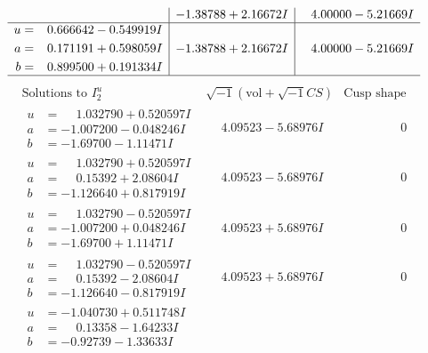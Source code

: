 \documentclass[1p]{elsarticle_modified}
\theoremstyle{definition}
\newcommand{\I}{\sqrt{-1}}
\begin{document}
$$\begin{array}{c|c|c}
 & -1.38788 + 2.16672 I & \phantom{-}4.00000 - 5.21669 I \\ \hline\begin{aligned}
u &= \phantom{-}0.666642 - 0.549919 I \\
a &= \phantom{-}0.171191 + 0.598059 I \\
b &= \phantom{-}0.899500 + 0.191334 I\end{aligned}
 & -1.38788 + 2.16672 I & \phantom{-}4.00000 - 5.21669 I\\
 \hline 
 \end{array}$$\newpage$$\begin{array}{c|c|c}  
\text{Solutions to }I^u_{2}& \I (\text{vol} + \sqrt{-1}CS) & \text{Cusp shape}\\
 \hline 
\begin{aligned}
u &= \phantom{-}1.032790 + 0.520597 I \\
a &= -1.007200 - 0.048246 I \\
b &= -1.69700 - 1.11471 I\end{aligned}
 & \phantom{-}4.09523 - 5.68976 I & \phantom{-0.000000 } 0 \\ \hline\begin{aligned}
u &= \phantom{-}1.032790 + 0.520597 I \\
a &= \phantom{-}0.15392 + 2.08604 I \\
b &= -1.126640 + 0.817919 I\end{aligned}
 & \phantom{-}4.09523 - 5.68976 I & \phantom{-0.000000 } 0 \\ \hline\begin{aligned}
u &= \phantom{-}1.032790 - 0.520597 I \\
a &= -1.007200 + 0.048246 I \\
b &= -1.69700 + 1.11471 I\end{aligned}
 & \phantom{-}4.09523 + 5.68976 I & \phantom{-0.000000 } 0 \\ \hline\begin{aligned}
u &= \phantom{-}1.032790 - 0.520597 I \\
a &= \phantom{-}0.15392 - 2.08604 I \\
b &= -1.126640 - 0.817919 I\end{aligned}
 & \phantom{-}4.09523 + 5.68976 I & \phantom{-0.000000 } 0 \\ \hline\begin{aligned}
u &= -1.040730 + 0.511748 I \\
a &= \phantom{-}0.13358 - 1.64233 I \\
b &= -0.92739 - 1.33633 I\end{aligned}

\end{array}$$
\end{document}
